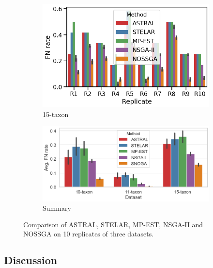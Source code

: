 \begin{figure}[!htbp]
\begin{adjustwidth}{-1cm}{}
	\begin{subfigure}[b]{0.55\textwidth}
		\includegraphics[width=\textwidth]{Figure/15-taxon_10_replicates}
		\caption{15-taxon}
	\end{subfigure}
	\begin{subfigure}[b]{0.55\textwidth}
		\includegraphics[width=\textwidth]{Figure/all_dataset_compare}
		\caption{Summary}
	\end{subfigure}%
\end{adjustwidth}
	\caption{Comparison of ASTRAL, STELAR, MP-EST, NSGA-II and NOSSGA on 10 replicates of three datasets.}
	\label{fig:datasets}
\end{figure}

\subsection{Discussion}